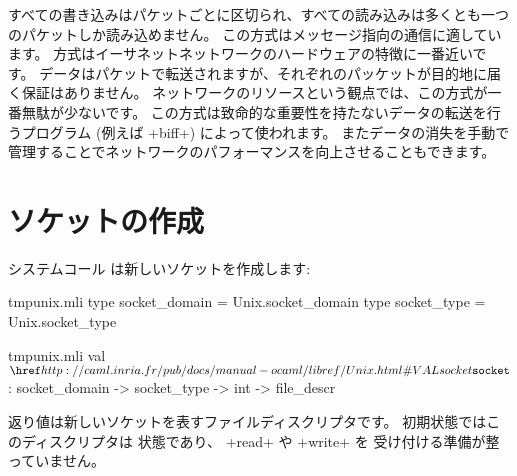すべての書き込みはパケットごとに区切られ、すべての読み込みは多くとも一つのパケットしか読み込めません。
この方式はメッセージ指向の通信に適しています。
 方式はイーサネットネットワークのハードウェアの特徴に一番近いです。
データはパケットで転送されますが、それぞれのパッケットが目的地に届く保証はありません。
ネットワークのリソースという観点では、この方式が一番無駄が少ないです。
この方式は致命的な重要性を持たないデータの転送を行うプログラム (例えば \ml+biff+) によって使われます。
またデータの消失を手動で管理することでネットワークのパフォーマンスを向上させることもできます。
%
\section{ソケットの作成}

システムコール  は新しいソケットを作成します:
%
\begin{codefile}{tmpunix.mli}
type socket_domain = Unix.socket_domain
type socket_type = Unix.socket_type
\end{codefile}
%
\begin{listingcodefile}{tmpunix.mli}
val $\libvalue{Unix}{socket}$ : socket_domain -> socket_type -> int -> file_descr
\end{listingcodefile}
%
返り値は新しいソケットを表すファイルディスクリプタです。
初期状態ではこのディスクリプタは  状態であり、 \ml+read+ や \ml+write+ を
受け付ける準備が整っていません。

